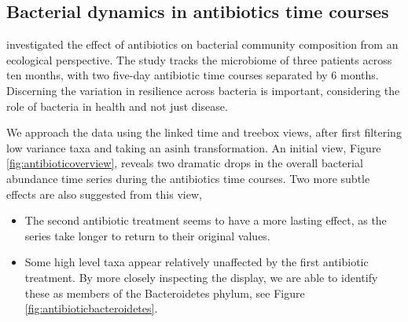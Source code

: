 \documentclass{report}
\begin{document}
\subsection{Bacterial dynamics in antibiotics time courses}
\label{bacterial-dynamics-of-antibiotics-time-courses}

\citet{dethlefsen2008pervasive} investigated the effect of antibiotics on
bacterial community composition from an ecological perspective. The study tracks
the microbiome of three patients across ten months, with two five-day antibiotic
time courses separated by 6 months. Discerning the variation in resilience
across bacteria is important, considering the role of bacteria in health and
not just disease.

We approach the data using the linked time and treebox views, after first
filtering low variance taxa and taking an \(\text{asinh}\) transformation. An
initial view, Figure \ref{fig:antibioticoverview}, reveals two dramatic drops in
the overall bacterial abundance time series during the antibiotics time courses.
Two more subtle effects are also suggested from this view,

\begin{itemize}
\item
  The second antibiotic treatment seems to have a more lasting effect,
  as the series take longer to return to their original values.
\item
  Some high level taxa appear relatively unaffected by the first
  antibiotic treatment. By more closely inspecting the display, we are
  able to identify these as members of the Bacteroidetes phylum, see
  Figure \ref{fig:antibioticbacteroidetes}.
\end{itemize}
\end{document}
